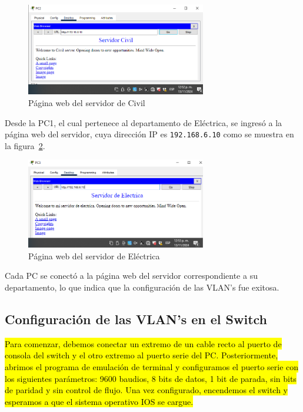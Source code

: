        \begin{figure}[H]
            \centering
            \includegraphics[width=0.7\textwidth]{img/ServerCivil.PNG}
            \caption{Página web del servidor de Civil}
            \label{fig:servidorCivil}
        \end{figure}

        Desde la PC1, el cual pertenece al departamento de Eléctrica, se ingresó a la página web del servidor, cuya dirección IP es \texttt{192.168.6.10} como se muestra en la figura~\ref{fig:servidorElectrica}.

        \begin{figure}[H]
            \centering
            \includegraphics[width=0.7\textwidth]{img/serverElectrica.PNG}
            \caption{Página web del servidor de Eléctrica}
            \label{fig:servidorElectrica}
        \end{figure}

        Cada PC se conectó a la página web del servidor correspondiente a su departamento, lo que indica que la configuración de las VLAN's fue exitosa.



    \subsection{Configuración de las VLAN's en el Switch}
    \hl{Para comenzar, debemos conectar un extremo de un cable recto al puerto de consola del switch y el otro extremo al puerto serie del PC. Posteriormente, abrimos el programa de emulación de terminal y configuramos el puerto serie con los siguientes parámetros: 9600 baudios, 8 bits de datos, 1 bit de parada, sin bits de paridad y sin control de flujo. Una vez configurado, encendemos el switch y esperamos a que el sistema operativo IOS se cargue.}


